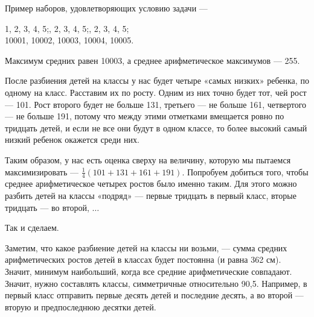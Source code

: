 ﻿

\begin{itemize}
\itA Пример наборов, удовлетворяющих условию задачи —

1, 2, 3, 4, 5;, 2, 3, 4, 5;, 2, 3, 4, 5;\quad\\
10001, 10002, 10003, 10004, 10005.

Максимум средних равен 10003, а среднее арифметическое максимумов — 255.

\itB После разбиения детей на классы у нас будет четыре «самых низких» ребенка, по одному на класс. Расставим их по росту. Одним из них точно будет тот, чей рост — \SI{101}{}. Рост второго будет не больше 131, третьего — не больше 161, четвертого — не больше 191, потому что между этими отметками вмещается ровно по тридцать детей, и если не все они будут в одном классе, то более высокий самый низкий ребенок окажется среди них.

Таким образом, у нас есть оценка сверху на величину, которую мы пытаемся максимизировать — $\tfrac{1}{4}(101+131+161+191)$. Попробуем добиться того, чтобы среднее арифметическое четырех ростов было именно таким. Для этого можно разбить детей на классы «подряд» — первые тридцать в первый класс, вторые тридцать — во второй, $\ldots$

Так и сделаем.

\itC Заметим, что какое разбиение детей на классы ни возьми, — сумма средних арифметических ростов детей в классах будет постоянна (и равна 362 см). Значит, минимум наибольший, когда все средние арифметические совпадают. Значит, нужно составлять классы, симметричные относительно 90,5. Например, в первый класс отправить первые десять детей и последние десять, а во второй — вторую и предпоследнюю десятки детей.
\end{itemize}